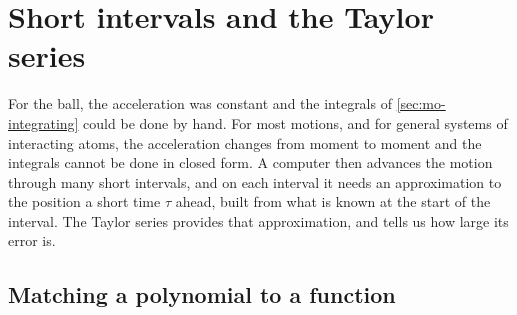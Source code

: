 \section{Short intervals and the Taylor series}
\label{sec:mo-taylor}

For the ball, the acceleration was constant and the integrals of
\cref{sec:mo-integrating} could be done by hand. For most motions, and for
general systems of interacting atoms, the acceleration changes from
moment to moment and the integrals cannot be done in closed form. A
computer then advances the motion through many short intervals, and on
each interval it needs an approximation to the position a short time
$\tau$ ahead, built from what is known at the start of the interval. The
Taylor series provides that approximation, and tells us how large its
error is.

\subsection*{Matching a polynomial to a function}

